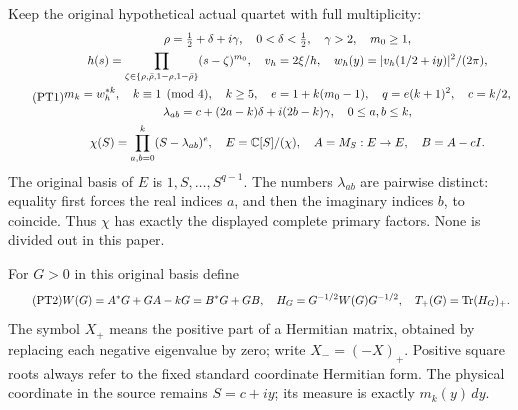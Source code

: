 Keep the original hypothetical actual quartet with full multiplicity:
\begin{equation}\tag{PT1}
\begin{gathered}
 \rho=\tfrac12+\delta+i\gamma,\quad
 0<\delta<\tfrac12,\quad\gamma>2,\quad m_0\ge1,\\
 h(s)=\prod_{\zeta\in\{\rho,\bar\rho,1-\rho,1-\bar\rho\}}
                     (s-\zeta)^{m_0},\quad
 v_h=2\xi/h,\quad w_h(y)=|v_h(1/2+iy)|^2/(2\pi),\\
 m_k=w_h^{*k},\quad k\equiv1\pmod4,\quad k\ge5,\quad
 e=1+k(m_0-1),\quad q=e(k+1)^2,\quad c=k/2,\\
 \lambda_{ab}=c+(2a-k)\delta+i(2b-k)\gamma,\quad0\le a,b\le k,\\
 \chi(S)=\prod_{a,b=0}^k(S-\lambda_{ab})^e,\quad
 E=\mathbb C[S]/(\chi),\quad A=M_S:E\to E,\quad B=A-cI.
\end{gathered}
\end{equation}
The original basis of \(E\) is \(1,S,\ldots,S^{q-1}\).
The numbers \(\lambda_{ab}\) are pairwise distinct: equality first
forces the real indices \(a\), and then the imaginary indices \(b\),
to coincide. Thus \(\chi\) has exactly the displayed complete primary
factors. None is divided out in this paper.

For \(G>0\) in this original basis define
\begin{equation}\tag{PT2}
 W(G)=A^*G+GA-kG=B^*G+GB,\quad
 H_G=G^{-1/2}W(G)G^{-1/2},\quad
 T_+(G)=\operatorname{Tr}(H_G)_+.
\end{equation}
The symbol \(X_+\) means the positive part of a Hermitian matrix,
obtained by replacing each negative eigenvalue by zero; write
\(X_-=(-X)_+\). Positive square roots always refer to the fixed
standard coordinate Hermitian form. The physical coordinate in the
source remains \(S=c+iy\); its measure is exactly \(m_k(y)\,dy\).

